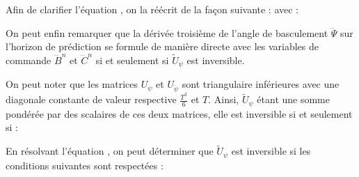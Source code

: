 					Afin de clarifier l'équation , on la réécrit de la façon suivante :
					avec :
				
					
					On peut enfin remarquer que la dérivée troisième de l'angle de basculement $\dddot\Psi$ sur l'horizon de prédiction se formule de manière directe avec les variables de commande $\dddot{B}^n$ et $\dddot{C}^n$
					si et seulement si $\tilde{U}_\psi$ est inversible.
				
					On peut noter que les matrices $U_\psi$ et $U_{\ddot{\psi}}$ sont triangulaire inférieures avec une diagonale constante de valeur respective $\frac{T^3}{6}$ et $T$.
					Ainsi, $\tilde{U}_\psi$ étant une somme pondérée par des scalaires de ces deux matrices, elle est inversible si et seulement si :
					
					En résolvant l'équation , on peut déterminer que $\tilde{U}_\psi$ est inversible si les conditions suivantes sont respectées :
					
